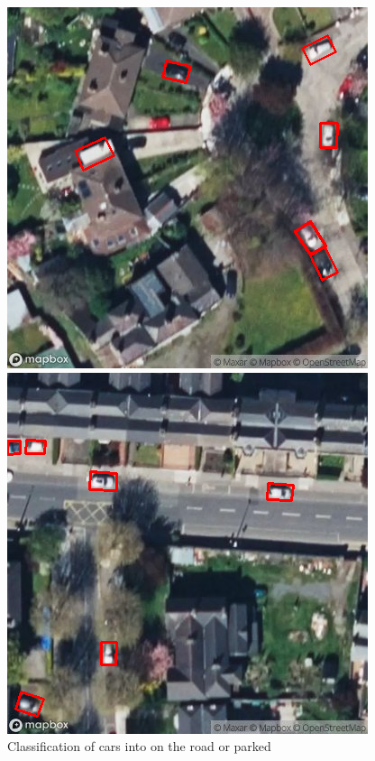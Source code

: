 \begin{figure}[htbp]
\begin{minipage}{0.45\textwidth}
        \includegraphics[width=\textwidth]{images/road_mask_classification2.png}
    \end{minipage}
    \hfill
    \begin{minipage}{0.45\textwidth}
        \centering
        \includegraphics[width=\textwidth]{images/road_mask_classification3.png}
    \end{minipage}
    \caption{Classification of cars into on the road or parked}
    \label{fig:Road_mask_classification}
\end{figure}

